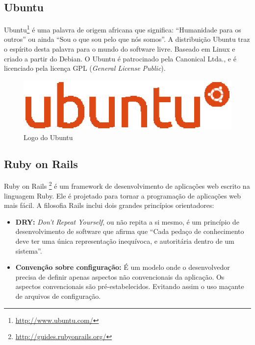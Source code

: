 \subsection{Ubuntu}

Ubuntu\footnote{\url{http://www.ubuntu.com/}} é uma palavra de origem africana que significa: ``Humanidade para os outros'' ou ainda ``Sou o que sou pelo que nós somos''. A distribuição Ubuntu traz o espírito desta palavra para o mundo do software livre. Baseado em Linux e criado a partir do Debian. O Ubuntu é patrocinado pela Canonical Ltda., e é licenciado pela licença GPL (\textit{General License Public}).

\begin{figure}[!h]
	\centering
	\includegraphics[scale=0.4]{figuras/capitulo3/ubuntu.eps}
	\caption{Logo do Ubuntu}
	\label{ubuntu}
\end{figure}

\subsection{Ruby on Rails}

Ruby on Rails \footnote{\url{http://guides.rubyonrails.org/}} é um framework de desenvolvimento de aplicações web escrito na linguagem Ruby. Ele é projetado para tornar a programação de aplicações web mais fácil. A filosofia Rails inclui dois grandes princípios orientadores:

\begin{itemize}
	\item \textbf{DRY:} \textit{Don't Repeat Yourself}, ou não repita a si mesmo, é um princípio de desenvolvimento de software que afirma que ``Cada pedaço de conhecimento deve ter uma única representação inequívoca, e autoritária dentro de um sistema''.

	\item \textbf{Convenção sobre configuração:} É um modelo onde o desenvolvedor precisa de definir apenas aspectos não convencionais da aplicação. Os aspectos convencionais são pré-estabelecidos. Evitando assim o uso maçante de arquivos de configuração.
\end{itemize}

